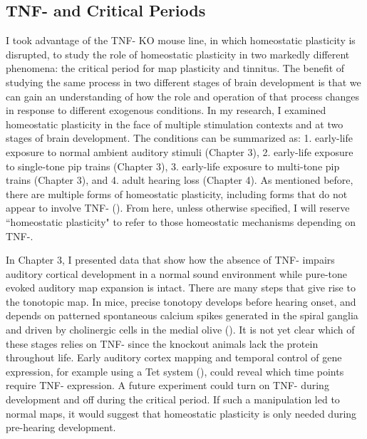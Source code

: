 \subsection{TNF-\textalpha{} and Critical Periods}

I took advantage of the TNF-\textalpha{} KO mouse line, in which homeostatic plasticity is disrupted, to study the role of homeostatic plasticity in two markedly different phenomena: the critical period for map plasticity and tinnitus.
The benefit of studying the same process in two different stages of brain development is that we can gain an understanding of how the role and operation of that process changes in response to different exogenous conditions. In my research, I examined homeostatic plasticity in the face of multiple stimulation contexts and at two stages of brain development. The conditions can be summarized as: 1. early-life exposure to normal ambient auditory stimuli (Chapter 3), 2. early-life exposure to single-tone pip trains (Chapter 3), 3. early-life exposure to multi-tone pip trains (Chapter 3), and 4. adult hearing loss (Chapter 4). As mentioned before, there are multiple forms of homeostatic plasticity, including forms that do not appear to involve TNF-\textalpha{} (\cite{Stellwagen2006}). From here, unless otherwise specified, I will reserve ``homeostatic plasticity" to refer to those homeostatic mechanisms depending on TNF-\textalpha{}.

In Chapter 3, I presented data that show how the absence of TNF-\textalpha{} impairs auditory cortical development in a normal sound environment while pure-tone evoked auditory map expansion is intact. There are many steps that give rise to the tonotopic map. In mice, precise tonotopy develops before hearing onset, and depends on patterned spontaneous calcium spikes generated in the spiral ganglia and driven by cholinergic cells in the medial olive (\cite{Elgoyhen1994, Cao2008, Clause2014}). It is not yet clear which of these stages relies on TNF-\textalpha{} since the knockout animals lack the protein throughout life. Early auditory cortex mapping and temporal control of gene expression, for example using a Tet system (\cite{Gossen1995}), could reveal which time points require TNF-\textalpha{} expression. A future experiment could turn on TNF-\textalpha{} during development and off during the critical period. If such a manipulation led to normal maps, it would suggest that homeostatic plasticity is only needed during pre-hearing development.

